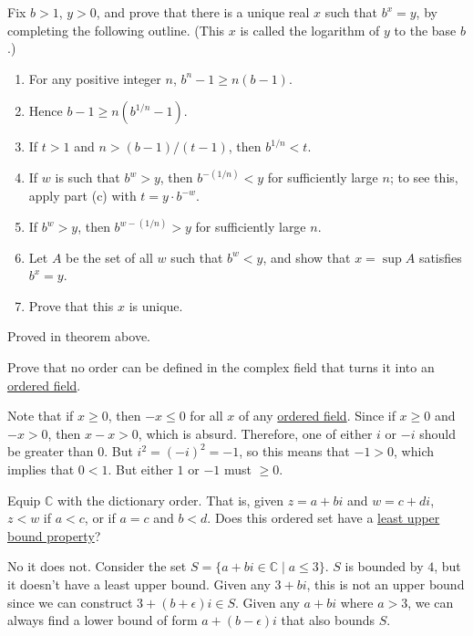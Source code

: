   \begin{exercise}[Rudin 1.7]
    Fix $b > 1$, $y > 0$, and prove that there is a unique real $x$ such that $b^x = y$, by
    completing the following outline. (This $x$ is called the logarithm of $y$ to the base $b$.)
    \begin{enumerate}
      \item For any positive integer $n$, $b^n - 1 \geq n(b-1)$.
      \item Hence $b - 1 \geq n(b^{1/n} - 1)$.
      \item If $t > 1$ and $n > (b-1)/(t-1)$, then $b^{1/n} < t$.
      \item If $w$ is such that $b^w > y$, then $b^{-(1/n)} < y$ for sufficiently large $n$; to see this,
        apply part (c) with $t = y \cdot b^{-w}$.
      \item If $b^w > y$, then $b^{w-(1/n)} > y$ for sufficiently large $n$.
      \item Let $A$ be the set of all $w$ such that $b^w < y$, and show that $x = \sup A$ satisfies
        $b^x = y$.
      \item Prove that this $x$ is unique.
    \end{enumerate}
  \end{exercise}
  \begin{solution}
    Proved in theorem above. 
  \end{solution}

  \begin{exercise}[Rudin 1.8]
    Prove that no order can be defined in the complex field that turns it into an \hyperref[alg-def:ordered-field]{ordered field}. 
  \end{exercise}
  \begin{solution}
    Note that if $x \geq 0$, then $-x \leq 0$ for all $x$ of any \hyperref[alg-def:ordered-field]{ordered field}. Since if $x \geq 0$ and $-x > 0$, then $x -x > 0$, which is absurd. Therefore, one of either $i$ or $-i$ should be greater than $0$. But $i^2 = (-i)^2 = -1$, so this means that $-1 > 0$, which implies that $0 < 1$. But either $1$ or $-1$ must $\geq 0$. 
  \end{solution}

  \begin{exercise}[Rudin 1.9]
    Equip $\mathbb{C}$ with the dictionary order. That is, given $z = a + bi$ and $w = c + di$, $z < w$ if $a < c$, or if $a = c$ and $b < d$. Does this ordered set have a \hyperref[def:least-upper-bound-property]{least upper bound property}? 
  \end{exercise}
  \begin{solution}
    No it does not. Consider the set $S = \{ a + b i \in \mathbb{C} \mid a \leq 3\}$. $S$ is bounded by $4$, but it doesn't have a least upper bound. Given any $3 + bi$, this is not an upper bound since we can construct $3 + (b + \epsilon) i \in S$. Given any $a + bi$ where $a > 3$, we can always find a lower bound of form $a + (b - \epsilon) i$ that also bounds $S$. 
  \end{solution}

